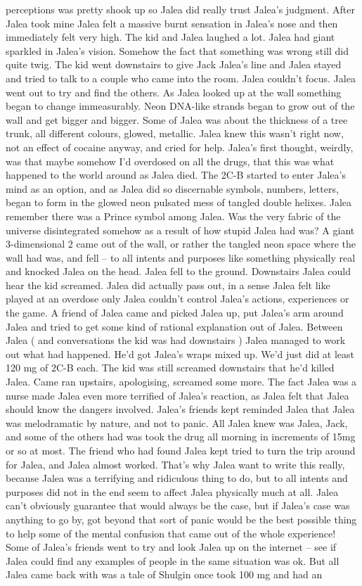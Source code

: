 \documentclass[12pt]{book}
\begin{document}
perceptions was pretty shook up so Jalea did really trust Jalea's judgment. After Jalea took mine Jalea felt a massive burnt sensation in Jalea's nose and then immediately felt very high. The kid and Jalea laughed a lot. Jalea had giant sparkled in Jalea's vision. Somehow the fact that something was wrong still did quite twig. The kid went downstairs to give Jack Jalea's line and Jalea stayed and tried to talk to a couple who came into the room. Jalea couldn't focus. Jalea went out to try and find the others. As Jalea looked up at the wall something began to change immeasurably. Neon DNA-like strands began to grow out of the wall and get bigger and bigger. Some of Jalea was about the thickness of a tree trunk, all different colours, glowed, metallic. Jalea knew this wasn't right now, not an effect of cocaine anyway, and cried for help. Jalea's first thought, weirdly, was that maybe somehow I'd overdosed on all the drugs, that this was what happened to the world around as Jalea died. The 2C-B started to enter Jalea's mind as an option, and as Jalea did so discernable symbols, numbers, letters, began to form in the glowed neon pulsated mess of tangled double helixes. Jalea remember there was a Prince symbol among Jalea. Was the very fabric of the universe disintegrated somehow as a result of how stupid Jalea had was? A giant 3-dimensional 2 came out of the wall, or rather the tangled neon space where the wall had was, and fell -- to all intents and purposes like something physically real and knocked Jalea on the head. Jalea fell to the ground. Downstairs Jalea could hear the kid screamed. Jalea did actually pass out, in a sense Jalea felt like played at an overdose only Jalea couldn't control Jalea's actions, experiences or the game. A friend of Jalea came and picked Jalea up, put Jalea's arm around Jalea and tried to get some kind of rational explanation out of Jalea. Between Jalea ( and conversations the kid was had downstairs ) Jalea managed to work out what had happened. He'd got Jalea's wraps mixed up. We'd just did at least 120 mg of 2C-B each. The kid was still screamed downstairs that he'd killed Jalea. Came ran upstairs, apologising, screamed some more. The fact Jalea was a nurse made Jalea even more terrified of Jalea's reaction, as Jalea felt that Jalea should know the dangers involved. Jalea's friends kept reminded Jalea that Jalea was melodramatic by nature, and not to panic. All Jalea knew was Jalea, Jack, and some of the others had was took the drug all morning in increments of 15mg or so at most. The friend who had found Jalea kept tried to turn the trip around for Jalea, and Jalea almost worked. That's why Jalea want to write this really, because Jalea was a terrifying and ridiculous thing to do, but to all intents and purposes did not in the end seem to affect Jalea physically much at all. Jalea can't obviously guarantee that would always be the case, but if Jalea's case was anything to go by, got beyond that sort of panic would be the best possible thing to help some of the mental confusion that came out of the whole experience! Some of Jalea's friends went to try and look Jalea up on the internet -- see if Jalea could find any examples of people in the same situation was ok. But all Jalea came back with was a tale of Shulgin once took 100 mg and had an 
\end{document}
